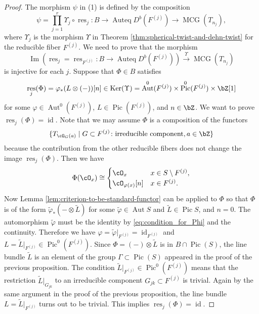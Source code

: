 \documentclass[12pt]{amsart}
\numberwithin{equation}{section}
\theoremstyle{plain}
\theoremstyle{definition}
\DeclareMathOperator{\Auteq}{\mathrm{Auteq}}
\DeclareMathOperator{\id}{\mathrm{id}}
\DeclareMathOperator{\Pic}{\mathrm{Pic}}
\DeclareMathOperator{\MCG}{\mathrm{MCG}}
\DeclareMathOperator{\Ker}{\mathrm{Ker}}
\DeclareMathOperator{\Image}{\mathrm{Im}}
\DeclareMathOperator{\Aut}{\mathrm{Aut}}
\DeclareMathOperator{\res}{\mathrm{res}}
\begin{document}
\begin{proof}
    The morphism $\psi$ in (1) is defined by the composition
    \begin{equation}
        \psi = \prod_{j=1}^r \Upsilon_j \circ \res_j \colon B \to \Auteq D^b(F^{(j)}) \to \MCG(T_{n_j}),
    \end{equation}
    where $\Upsilon_j$ is the morphism $\Upsilon$ in Theorem \ref{thm:spherical-twist-and-dehn-twist} for the reducible fiber $F^{(j)}$.
    We need to prove that the morphism
    \begin{equation}
        \Image\left(\res_j = \res_{F^{(j)}} \colon B \to \Auteq D^b(F^{(j)})\right) \xrightarrow{\Upsilon} \MCG(T_{n_j})
    \end{equation}
    is injective for each $j$.
    Suppose that $\Phi \in B$ satisfies
    \begin{equation}
        \res_j(\Phi) = \varphi_*(L \otimes (-))[n] \in \Ker(\Upsilon) = \Aut^0(F^{(j)})\times \Pic^0(F^{(j)}) \times \bZ[1]
    \end{equation}
    for some $\varphi \in \Aut^0(F^{(j)})$, $L \in \Pic(F^{(j)})$, and $n \in \bZ$.
    We want to prove $\res_j(\Phi) = \id$.
    Note that we may assume $\Phi$ is a composition of the functors
    \begin{equation}
        \{T_{\cO_{G}(a)} \mid G \subset F^{(j)} \colon \text{irreducible component}, a \in \bZ\}
    \end{equation}
    because the contribution from the other reducible fibers does not change the image $\res_j(\Phi)$.
    Then we have
    \begin{equation}\label{eq:condition_for_Phi}
        \Phi(\cO_x) \cong \begin{cases}
            \cO_x               & x \in S \setminus F^{(j)}, \\
            \cO_{\varphi(x)}[n] & x \in F^{(j)}.
        \end{cases}
    \end{equation}
    Now Lemma \ref{lem:criterion-to-be-standard-functor} can be applied to $\Phi$ so that $\Phi$ is of the form $\widetilde{\varphi}_*(- \otimes \widetilde{L})$ for some $\widetilde{\varphi}\in \Aut{S}$ and $\widetilde{L} \in \Pic{S}$, and $n = 0$.
    The automorphism $\widetilde{\varphi}$ must be the identity by \eqref{eq:condition_for_Phi} and the continuity.
    Therefore we have $\varphi = \widetilde{\varphi}\lvert_{F^{(j)}} = \id_{F^{(j)}}$ and $L = \widetilde{L}\lvert_{F^{(j)}} \in \Pic^0(F^{(j)})$.
    Since $\Phi = (-) \otimes \widetilde{L}$ is in $B \cap \Pic(S)$, the line bundle $\widetilde{L}$ is an element of the group $\Gamma \subset \Pic(S)$ appeared in the proof of the previous proposition.
    The condition $\widetilde{L}\lvert_{F^{(j)}} \in \Pic^0(F^{(j)})$ means that the restriction $\widetilde{L} \lvert_{G_{jk}}$ to an irreducible component $G_{jk} \subset F^{(j)}$ is trivial.
    Again by the same argument in the proof of the previous proposition, the line bundle $L = \widetilde{L}\lvert_{F^{(j)}}$ turns out to be trivial.
    This implies $\res_j(\Phi) = \id$.


\end{proof}
\end{document}
